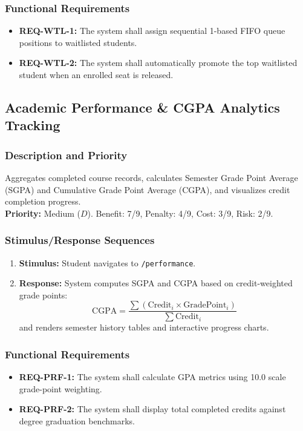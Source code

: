 \documentclass[a4paper,12pt]{article}
\begin{document}
\subsubsection{Functional Requirements}
\begin{itemize}[leftmargin=1.2cm]
    \item \textbf{REQ-WTL-1:} The system shall assign sequential 1-based FIFO queue positions to waitlisted students.
    \item \textbf{REQ-WTL-2:} The system shall automatically promote the top waitlisted student when an enrolled seat is released.
\end{itemize}

\subsection{Academic Performance \& CGPA Analytics Tracking}

\subsubsection{Description and Priority}
Aggregates completed course records, calculates Semester Grade Point Average (SGPA) and Cumulative Grade Point Average (CGPA), and visualizes credit completion progress. \\
\textbf{Priority:} Medium ($D$). Benefit: 7/9, Penalty: 4/9, Cost: 3/9, Risk: 2/9.

\subsubsection{Stimulus/Response Sequences}
\begin{enumerate}[leftmargin=1.2cm]
    \item \textbf{Stimulus:} Student navigates to \texttt{/performance}.
    \item \textbf{Response:} System computes SGPA and CGPA based on credit-weighted grade points:
    $$\text{CGPA} = \frac{\sum (\text{Credit}_i \times \text{GradePoint}_i)}{\sum \text{Credit}_i}$$
    and renders semester history tables and interactive progress charts.
\end{enumerate}

\subsubsection{Functional Requirements}
\begin{itemize}[leftmargin=1.2cm]
    \item \textbf{REQ-PRF-1:} The system shall calculate GPA metrics using 10.0 scale grade-point weighting.
    \item \textbf{REQ-PRF-2:} The system shall display total completed credits against degree graduation benchmarks.
\end{itemize}
\end{document}
